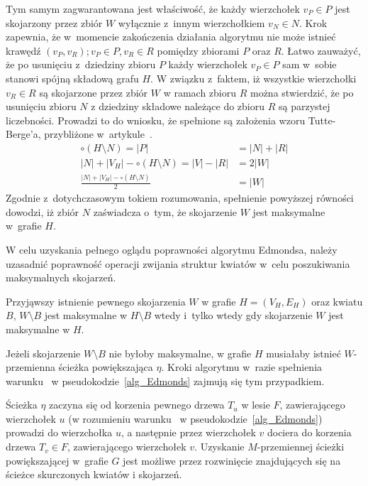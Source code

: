 {\begin{bproof}
    Tym samym zagwarantowana jest właściwość, że każdy wierzchołek $v_P \in P$ jest skojarzony przez zbiór $W$ wyłącznie z~innym wierzchołkiem $v_N \in N$.
    Krok~ zapewnia, że w~momencie zakończenia działania algorytmu nie może istnieć krawędź $(v_P, v_R); v_P \in P, v_R \in R$ pomiędzy zbiorami $P$ oraz $R$.
    Łatwo zauważyć, że po usunięciu z~dziedziny zbioru $P$ każdy wierzchołek $v_P \in P$ sam w~sobie stanowi spójną składową grafu $H$.
    W związku z~faktem, iż wszystkie wierzchołki $v_R \in R$ są skojarzone przez zbiór $W$ w ramach zbioru $R$ można stwierdzić, że po usunięciu zbioru $N$ z dziedziny składowe należące do zbioru $R$ są parzystej liczebności.
    Prowadzi to do wniosku, że spełnione są założenia wzoru Tutte-Berge'a, przybliżone w~artykule~\cite{cohen:hal-00358468}.
    \begin{align*}
        \circ(H \setminus N) = |P| &= |N| + |R|\\
        |N| + |V_H| - \circ(H \setminus N) = |V| - |R| &= 2|W|\\
        \frac{|N| + |V_H| - \circ (H \setminus N)}{2} &= |W|
    \end{align*}
    Zgodnie z~dotychczasowym tokiem rozumowania, spełnienie powyższej równości dowodzi, iż zbiór $N$ zaświadcza o~tym, że skojarzenie $W$ jest maksymalne w~grafie $H$.
  \end{bproof}
  W celu uzyskania pełnego oglądu poprawności algorytmu Edmondsa, należy uzasadnić poprawność operacji zwijania struktur kwiatów w~celu poszukiwania maksymalnych skojarzeń.
  \begin{theorem}
    Przyjąwszy istnienie pewnego skojarzenia $W$ w grafie $H=(V_H, E_H)$ oraz kwiatu $B$, $W \setminus B$ jest maksymalne w $H \setminus B$ wtedy i~tylko wtedy gdy skojarzenie $W$ jest maksymalne w $H$.
  \end{theorem}
  \begin{bproof}
    Jeżeli skojarzenie $W \setminus B$ nie byłoby maksymalne, w grafie $H$ musiałaby istnieć $W$-przemienna ścieżka powiększająca $\eta$.
    Kroki algorytmu w~razie spełnienia warunku~ w pseudokodzie~\ref{alg_Edmonds} zajmują się tym przypadkiem.

    Ścieżka $\eta$ zaczyna się od korzenia pewnego drzewa $T_u$ w lesie $F$, zawierającego wierzchołek $u$ (w rozumieniu warunku~ w pseudokodzie~\ref{alg_Edmonds}) prowadzi do wierzchołka $u$, a następnie przez wierzchołek $v$ dociera do korzenia drzewa $T_v \in F$, zawierającego wierzchołek $v$.
    Uzyskanie $M$-przemiennej ścieżki powiększającej w~grafie $G$ jest możliwe przez rozwinięcie znajdujących się na ścieżce skurczonych kwiatów i 
    skojarzeń.


\end{bproof}}
